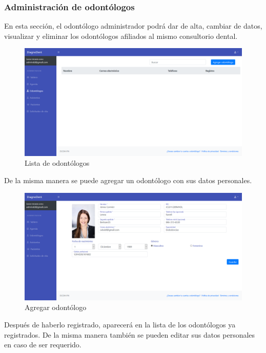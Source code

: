 \vspace{1em}

\subsubsection{Administración de odontólogos}

En esta sección, el odontólogo administrador podrá dar de alta, cambiar de datos, visualizar y eliminar los odontólogos afiliados al mismo consultorio dental.

\begin{figure}[H]
\centering
\includegraphics[width=17cm,keepaspectratio]{pictures/adminodo/odontologos/lista-odontologos-1.png}
\caption{Lista de odontólogos}
\end{figure}

De la misma manera se puede agregar un odontólogo con sus datos personales.

\begin{figure}[H]
\centering
\includegraphics[width=17cm,keepaspectratio]{pictures/adminodo/odontologos/registrar-odo.png}
\caption{Agregar odontólogo}
\end{figure}

Después de haberlo registrado, aparecerá en la lista de los odontólogos ya registrados. De la misma manera también se pueden editar sus datos personales en caso de ser requerido.

